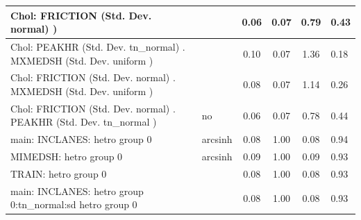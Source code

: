 \begin{table}
\begin{center}
\begin{tabular}{|l|l|c|c|c|l|}
			\hline
			 Chol: FRICTION (Std. Dev. normal) ) &  & 0.06 & 0.07 & 0.79 & 0.43 \\
			\hline
			 Chol: PEAKHR (Std. Dev. tn_normal) . MXMEDSH (Std. Dev.   uniform ) &  & 0.10 & 0.07 & 1.36 & 0.18 \\
			\hline
			 Chol: FRICTION (Std. Dev. normal) . MXMEDSH (Std. Dev.   uniform ) &  & 0.08 & 0.07 & 1.14 & 0.26 \\
			\hline
			 Chol: FRICTION (Std. Dev. normal) . PEAKHR (Std. Dev.   tn_normal ) & no & 0.06 & 0.07 & 0.78 & 0.44 \\
			\hline
			main: INCLANES: hetro group 0 & arcsinh & 0.08 & 1.00 & 0.08 & 0.94 \\
			\hline
			MIMEDSH: hetro group 0 & arcsinh & 0.09 & 1.00 & 0.09 & 0.93 \\
			\hline
			TRAIN: hetro group 0 &  & 0.08 & 1.00 & 0.08 & 0.93 \\
			\hline
			main: INCLANES: hetro group 0:tn_normal:sd  hetro group 0 &  & 0.08 & 1.00 & 0.08 & 0.93 \\
			\hline
		\end{tabular}
	\end{center}
\end{table}